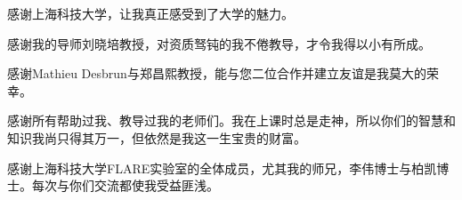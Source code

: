 \begin{acknowledgement}
    感谢上海科技大学，让我真正感受到了大学的魅力。

    感谢我的导师刘晓培教授，对资质驽钝的我不倦教导，才令我得以小有所成。

    感谢Mathieu Desbrun与郑昌熙教授，能与您二位合作并建立友谊是我莫大的荣幸。

    感谢所有帮助过我、教导过我的老师们。我在上课时总是走神，所以你们的智慧和知识我尚只得其万一，但依然是我这一生宝贵的财富。

    感谢上海科技大学FLARE实验室的全体成员，尤其我的师兄，李伟博士与柏凯博士。每次与你们交流都使我受益匪浅。
\end{acknowledgement}